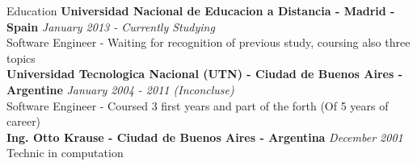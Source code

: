 \documentclass{resume} %
\begin{document}

\begin{rSection}{Education}
{\bf Universidad Nacional de Educacion a Distancia  - Madrid - Spain } \hfill {\em January 2013 - Currently Studying} \\ 
Software Engineer - Waiting for recognition of previous study, coursing also three topics \\


{\bf Universidad Tecnologica Nacional (UTN) - Ciudad de Buenos Aires - Argentine} \hfill {\em January 2004 - 2011 (Inconcluse)} \\ 
Software Engineer - Coursed 3 first years and part of the forth  (Of 5 years of career) \\

{\bf Ing. Otto Krause - Ciudad de Buenos Aires - Argentina} \hfill {\em December 2001} \\ 
Technic in computation \\
\end{rSection}





\end{document}
